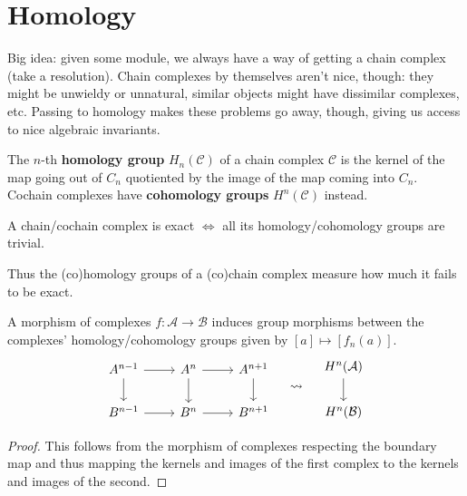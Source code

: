 \documentclass[twoside,10pt]{report}
\begin{document}
\section{Homology}

\begin{note}[]
	Big idea: given some module, we always have a way of getting a chain complex (take a resolution). Chain complexes by themselves aren't nice, though: they might be unwieldy or unnatural, similar objects might have dissimilar complexes, etc. Passing to homology makes these problems go away, though, giving us access to nice algebraic invariants.
\end{note}

\begin{defn}[]
	The $n$-th \textbf{homology group} $H_{n}(\mathcal{C})$ of a chain complex $\mathcal{C}$ is the kernel of the map going out of $C_{n}$ quotiented by the image of the map coming into $C_{n}$. Cochain complexes have \textbf{cohomology groups} $H^{n}(\mathcal{C})$ instead.
\end{defn}

\begin{prop}
A chain/cochain complex is exact $\iff$ all its homology/cohomology groups are trivial.
\end{prop}

Thus the (co)homology groups of a (co)chain complex measure how much it fails to be exact.

\begin{prop}
	A morphism of complexes $f:\mathcal{A}\to \mathcal{B}$ induces group morphisms between the complexes' homology/cohomology groups given by $[a] \mapsto [f_{n}(a)]$.
\[
\begin{aligned}
	\begin{tikzcd}
		A^{n-1} \rar\dar & A^{n} \rar\dar & A^{n+1} \dar \\
		B^{n-1} \rar & B^{n} \rar & B^{n+1}
	\end{tikzcd}
	\quad \leadsto \quad
	\begin{tikzcd}
		H^{n}(\mathcal{A}) \dar \\
		H^{n}(\mathcal{B})
	\end{tikzcd}
\end{aligned}
\] 
\end{prop}
\begin{proof}
	This follows from the morphism of complexes respecting the boundary map and thus mapping the kernels and images of the first complex to the kernels and images of the second.
\end{proof}
\end{document}
